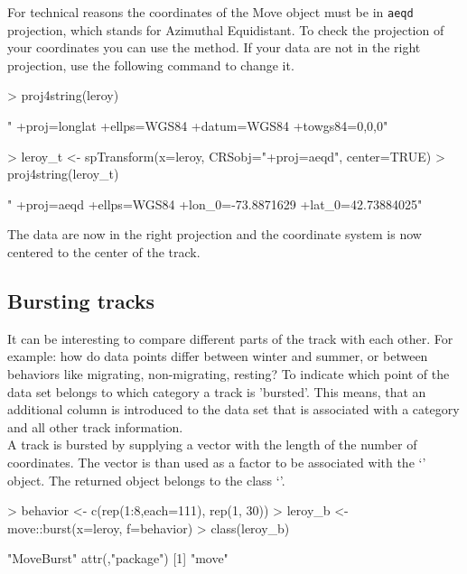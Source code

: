 \documentclass[article,nojss]{jss}
\newcommand{\fct}[1]{{\code{#1()}}}
\newcommand{\class}[1]{{`\code{#1}'}}
\begin{document}
For technical reasons the coordinates of the Move object must be in \texttt{aeqd} projection, which stands for Azimuthal Equidistant. To check the projection of your coordinates you can use the \fct{proj4string} method. If your data are not in the right projection, use the following command to change it. 

\begin{Schunk}
\begin{Sinput}
> proj4string(leroy)
\end{Sinput}
\begin{Soutput}
[1] " +proj=longlat +ellps=WGS84 +datum=WGS84 +towgs84=0,0,0"
\end{Soutput}
\begin{Sinput}
> leroy_t <- spTransform(x=leroy, CRSobj="+proj=aeqd", center=TRUE)  
> proj4string(leroy_t)
\end{Sinput}
\begin{Soutput}
[1] " +proj=aeqd +ellps=WGS84 +lon_0=-73.8871629 +lat_0=42.73884025"
\end{Soutput}
\end{Schunk}

The data are now in the right projection and the coordinate system is now centered to the center of the track. 


\subsection{Bursting tracks}
It can be interesting to compare different parts of the track with each other. For example: how do data points differ between winter and summer, or between behaviors like migrating, non-migrating, resting? To indicate which point of the data set belongs to which category a track is 'bursted'. This means, that an additional column is introduced to the data set that is associated with a category and all other track information. \\
A track is bursted by supplying a vector with the length of the number of coordinates. The vector is than used as a factor to be associated with the \class{Move} object. The returned object belongs to the class \class{MoveBurst}. 

\begin{Schunk}
\begin{Sinput}
> behavior <- c(rep(1:8,each=111), rep(1, 30))
> leroy_b <- move::burst(x=leroy, f=behavior)
> class(leroy_b)
\end{Sinput}
\begin{Soutput}
[1] "MoveBurst"
attr(,"package")
[1] "move"
\end{Soutput}
\end{Schunk}
\end{document}
